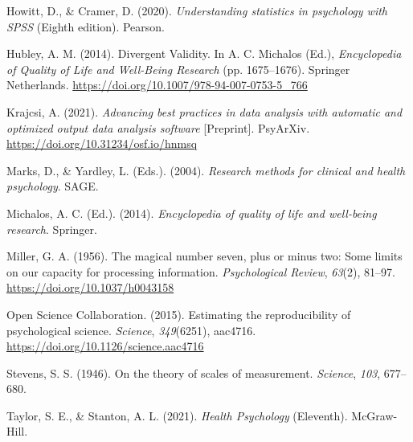 \documentclass[
  11pt,
]{book}
\newlength{\cslhangindent}
\newlength{\cslentryspacingunit} %
\newenvironment{CSLReferences}[2] %
 {%
  \setlength{\parindent}{0pt}
  \ifodd #1
  \let\oldpar\par
  \def\par{\hangindent=\cslhangindent\oldpar}
  \fi
  \setlength{\parskip}{#2\cslentryspacingunit}
 }%
 {}
\theoremstyle{definition}
\theoremstyle{definition}
\theoremstyle{definition}
\theoremstyle{definition}
\theoremstyle{remark}
\begin{document}
\begin{CSLReferences}{1}{0}
\leavevmode{}%
Howitt, D., \& Cramer, D. (2020). \emph{Understanding statistics in psychology with {SPSS}} (Eighth edition). {Pearson}.

\leavevmode{}%
Hubley, A. M. (2014). Divergent {Validity}. In A. C. Michalos (Ed.), \emph{Encyclopedia of {Quality} of {Life} and {Well-Being Research}} (pp. 1675--1676). {Springer Netherlands}. \url{https://doi.org/10.1007/978-94-007-0753-5_766}

\leavevmode{}%
Krajcsi, A. (2021). \emph{Advancing best practices in data analysis with automatic and optimized output data analysis software} {[}Preprint{]}. PsyArXiv. \url{https://doi.org/10.31234/osf.io/hnmsq}

\leavevmode{}%
Marks, D., \& Yardley, L. (Eds.). (2004). \emph{Research methods for clinical and health psychology}. {SAGE}.

\leavevmode{}%
Michalos, A. C. (Ed.). (2014). \emph{Encyclopedia of quality of life and well-being research}. {Springer}.

\leavevmode{}%
Miller, G. A. (1956). The magical number seven, plus or minus two: {Some} limits on our capacity for processing information. \emph{Psychological Review}, \emph{63}(2), 81--97. \url{https://doi.org/10.1037/h0043158}

\leavevmode{}%
Open Science Collaboration. (2015). Estimating the reproducibility of psychological science. \emph{Science}, \emph{349}(6251), aac4716. \url{https://doi.org/10.1126/science.aac4716}

\leavevmode{}%
Stevens, S. S. (1946). On the theory of scales of measurement. \emph{Science}, \emph{103}, 677--680.

\leavevmode{}%
Taylor, S. E., \& Stanton, A. L. (2021). \emph{Health {Psychology}} (Eleventh). {McGraw-Hill}.

\end{CSLReferences}
\end{document}
